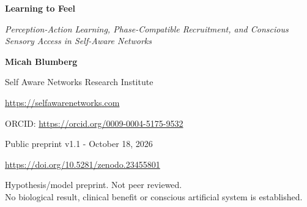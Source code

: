 \documentclass[
  american,
  11pt,
  letterpaper,
]{article}
\author{}
\date{}
\begin{document}
\begin{center}
{\LARGE\bfseries Learning to Feel\par}
\vspace{0.35em}
{\large\itshape Perception-Action Learning, Phase-Compatible Recruitment, and Conscious Sensory Access in Self-Aware Networks\par}
\vspace{0.8em}
{\small\textbf{Micah Blumberg}\par}
{\small Self Aware Networks Research Institute\par}
{\small\url{https://selfawarenetworks.com}\par}
{\small ORCID: \url{https://orcid.org/0009-0004-5175-9532}\par}
{\small Public preprint v1.1 - October 18, 2026\par}
{\small\url{https://doi.org/10.5281/zenodo.23455801}\par}
\end{center}

\begin{center}\small
Hypothesis/model preprint. Not peer reviewed.\\
No biological result, clinical benefit or conscious artificial system is established.
\end{center}
\end{document}
